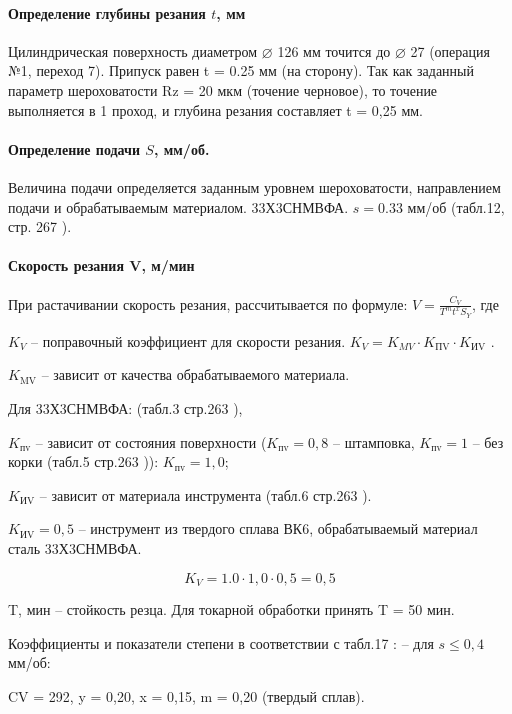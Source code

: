 \paragraph{Определение глубины резания $t$, мм}

Цилиндрическая поверхность диаметром $\varnothing$ 126 мм точится до $\varnothing$ 27 (операция №1, переход 7). Припуск равен t = 0.25 мм (на сторону).  Так как заданный параметр шероховатости Rz = 20 мкм (точение черновое), то точение выполняется в 1 проход, и глубина резания составляет t = 0,25 мм. 

\paragraph{Определение подачи $S$, мм/об.}

Величина подачи определяется заданным уровнем шероховатости, направлением подачи и обрабатываемым материалом. 33Х3СНМВФА.
$ s = 0.33 $ мм/об (табл.12, стр. 267 \cite{TECHNO}).

\paragraph{Скорость резания V, м/мин}

При растачивании скорость резания, рассчитывается по формуле:
$ V = \frac{C_V}{T^m t^x S_Y}$,   где

$K_V$ – поправочный коэффициент для скорости резания. $K_V = K_{MV} \cdot K_\text{ПV} \cdot K_\text{ИV}$ .

$K_\text{MV} $  – зависит от качества обрабатываемого материала.

Для 33Х3СНМВФА:	    (табл.3 стр.263 \cite{TECHNO}),

$K_\text{пv}$ – зависит от состояния поверхности ($K_\text{пv} = 0,8$ – штамповка, $K_\text{пv} = 1$ – без корки (табл.5 стр.263 \cite{TECHNO})):	$K_\text{пv} = 1,0$;

$K_\text{ИV}$ – зависит от материала инструмента (табл.6 стр.263 \cite{TECHNO}).

$K_\text{ИV} = 0,5$ – инструмент из твердого сплава ВК6, обрабатываемый материал сталь 33Х3СНМВФА.

$$K_V = 1.0 \cdot 1,0 \cdot 0,5 = 0,5$$

T, мин – стойкость резца.  Для токарной обработки принять  T = 50 мин.

Коэффициенты и показатели степени в соответствии с табл.17 \cite{TECHNO}:
– для  $s \le 0,4$   мм/об:

CV = 292, y = 0,20, x = 0,15, m = 0,20 (твердый сплав).

